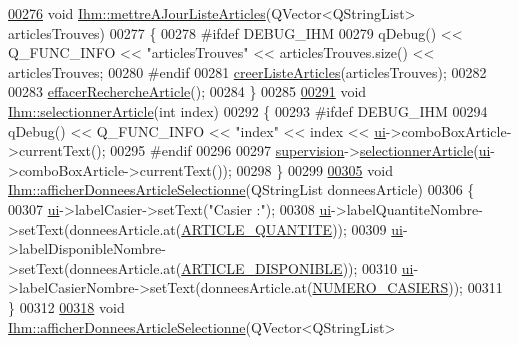 \begin{DoxyCode}
\hyperlink{class_ihm_a9b30cf664493a0089f95ec8b977a8f1e}{00276} \textcolor{keywordtype}{void} \hyperlink{class_ihm_a9b30cf664493a0089f95ec8b977a8f1e}{Ihm::mettreAJourListeArticles}(QVector<QStringList> articlesTrouves)
00277 \{
00278 \textcolor{preprocessor}{    #ifdef DEBUG\_IHM}
00279         qDebug() << Q\_FUNC\_INFO << \textcolor{stringliteral}{"articlesTrouves"} << articlesTrouves.size() << articlesTrouves;
00280 \textcolor{preprocessor}{    #endif}
00281     \hyperlink{class_ihm_ab632796a21015964c8d7615edb09261c}{creerListeArticles}(articlesTrouves);
00282 
00283     \hyperlink{class_ihm_acb37df89789d7c82be7336519091bc1f}{effacerRechercheArticle}();
00284 \}
00285 
\hyperlink{class_ihm_ad9b83836021fc8542db033da186cc64c}{00291} \textcolor{keywordtype}{void} \hyperlink{class_ihm_ad9b83836021fc8542db033da186cc64c}{Ihm::selectionnerArticle}(\textcolor{keywordtype}{int} index)
00292 \{
00293 \textcolor{preprocessor}{    #ifdef DEBUG\_IHM}
00294         qDebug() << Q\_FUNC\_INFO << \textcolor{stringliteral}{"index"} << index << \hyperlink{class_ihm_a0ac5f47856566ceeeca1720109bf70ea}{ui}->comboBoxArticle->currentText();
00295 \textcolor{preprocessor}{    #endif}
00296 
00297     \hyperlink{class_ihm_a454ab89ced1b27fcb42d550e443e780c}{supervision}->\hyperlink{class_supervision_a2efb7e4dabe2664c9cfd41d703b6250c}{selectionnerArticle}(\hyperlink{class_ihm_a0ac5f47856566ceeeca1720109bf70ea}{ui}->comboBoxArticle->currentText());
00298 \}
00299 
\hyperlink{class_ihm_aca73421fd372dc490c12f77e3bbdf00c}{00305} \textcolor{keywordtype}{void} \hyperlink{class_ihm_aca73421fd372dc490c12f77e3bbdf00c}{Ihm::afficherDonneesArticleSelectionne}(QStringList 
      donneesArticle)
00306 \{
00307     \hyperlink{class_ihm_a0ac5f47856566ceeeca1720109bf70ea}{ui}->labelCasier->setText(\textcolor{stringliteral}{"Casier :"});
00308     \hyperlink{class_ihm_a0ac5f47856566ceeeca1720109bf70ea}{ui}->labelQuantiteNombre->setText(donneesArticle.at(\hyperlink{_ihm_8h_ac91f014239536b9bb49d4265ca91d0d5}{ARTICLE\_QUANTITE}));
00309     \hyperlink{class_ihm_a0ac5f47856566ceeeca1720109bf70ea}{ui}->labelDisponibleNombre->setText(donneesArticle.at(\hyperlink{_ihm_8h_a2c5f129a41ff7dac8fa0d97af2d1efd5}{ARTICLE\_DISPONIBLE}));
00310     \hyperlink{class_ihm_a0ac5f47856566ceeeca1720109bf70ea}{ui}->labelCasierNombre->setText(donneesArticle.at(\hyperlink{_ihm_8h_a7935787ef2fa7206f347feff73167ce6}{NUMERO\_CASIERS}));
00311 \}
00312 
\hyperlink{class_ihm_af3569c42ee3f9cd38580d01a07212e44}{00318} \textcolor{keywordtype}{void} \hyperlink{class_ihm_aca73421fd372dc490c12f77e3bbdf00c}{Ihm::afficherDonneesArticleSelectionne}(QVector<QStringList> 

\end{DoxyCode}
